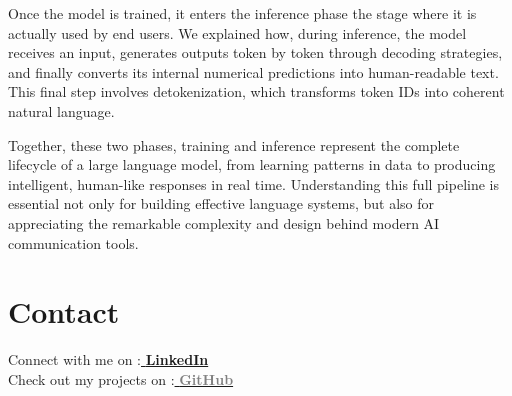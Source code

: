 \documentclass[12pt]{article}
\begin{document}
Once the model is trained, it enters the inference phase the stage where it is actually used by end users. We explained how, during inference, the model receives an input, generates outputs token by token through decoding strategies, and finally converts its internal numerical predictions into human-readable text. This final step involves detokenization, which transforms token IDs into coherent natural language.

Together, these two phases, training and inference represent the complete lifecycle of a large language model, from learning patterns in data to producing intelligent, human-like responses in real time. Understanding this full pipeline is essential not only for building effective language systems, but also for appreciating the remarkable complexity and design behind modern AI communication tools.





\section{Contact}

Connect with me on :\href{https://www.linkedin.com/in/badreddine-idrissi-kandri-365438329/}{\textcolor{blue!80!black}{\textbf{  LinkedIn}}} \\
Check out my projects on :\href{https://github.com/BadrKandri}{\textcolor{gray}{\textbf{  GitHub}}}
\end{document}
